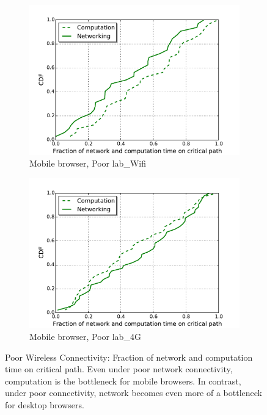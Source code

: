 \begin{figure}[!htb]
\begin{subfigure}{0.48\textwidth}
        \includegraphics[width=1\linewidth]{./figures/computation/poor/mobile-b20-d150.pdf}
        \caption{Mobile browser, Poor lab\_Wifi}
        \label{fig:mobile-b20-d150}
    \end{subfigure}%
    \begin{subfigure}{0.48\textwidth}
    \centering
        \includegraphics[width=1\linewidth]{./figures/computation/poor/mobile-b5-d150.pdf}
        \caption{Mobile browser, Poor lab\_4G}
        \label{fig:mobile-b5-d150}
    \end{subfigure}
      \caption{Poor Wireless Connectivity: Fraction of network and computation time on critical path. Even under poor network connectivity, computation is the bottleneck for mobile browsers. In contrast, under poor connectivity, network becomes even more of a bottleneck for desktop browsers.}
    \label{fig:comp_net_fraction_poor}
   \end{figure}


